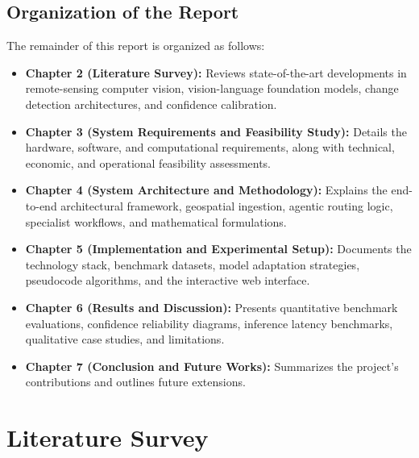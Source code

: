 \documentclass[12pt,a4paper]{report}
\begin{document}
\section{Organization of the Report}
The remainder of this report is organized as follows:
\begin{itemize}
    \item \textbf{Chapter 2 (Literature Survey):} Reviews state-of-the-art developments in remote-sensing computer vision, vision-language foundation models, change detection architectures, and confidence calibration.
    \item \textbf{Chapter 3 (System Requirements and Feasibility Study):} Details the hardware, software, and computational requirements, along with technical, economic, and operational feasibility assessments.
    \item \textbf{Chapter 4 (System Architecture and Methodology):} Explains the end-to-end architectural framework, geospatial ingestion, agentic routing logic, specialist workflows, and mathematical formulations.
    \item \textbf{Chapter 5 (Implementation and Experimental Setup):} Documents the technology stack, benchmark datasets, model adaptation strategies, pseudocode algorithms, and the interactive web interface.
    \item \textbf{Chapter 6 (Results and Discussion):} Presents quantitative benchmark evaluations, confidence reliability diagrams, inference latency benchmarks, qualitative case studies, and limitations.
    \item \textbf{Chapter 7 (Conclusion and Future Works):} Summarizes the project's contributions and outlines future extensions.
\end{itemize}

\chapter{Literature Survey}
\end{document}
